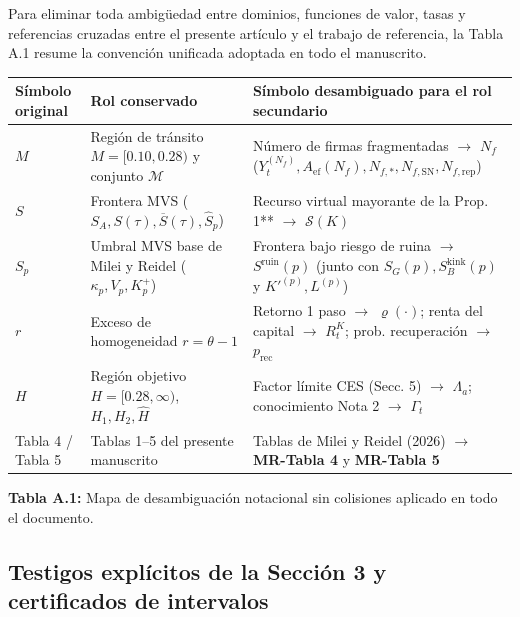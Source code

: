 \documentclass[11pt,letterpaper]{article}
\theoremstyle{plain}
\begin{document}
Para eliminar toda ambigüedad entre dominios, funciones de valor, tasas y referencias cruzadas entre el presente artículo y el trabajo de referencia, la Tabla A.1 resume la convención unificada adoptada en todo el manuscrito.

\begin{table}[htbp]
\centering
\scriptsize
\setlength{\tabcolsep}{4pt}
\begin{tabular}{@{}lll@{}}
\toprule
\textbf{Símbolo original} & \textbf{Rol conservado} & \textbf{Símbolo desambiguado para el rol secundario} \\
\midrule
$M$ & Región de tránsito $M=[0.10,0.28)$ y conjunto $\mathcal{M}$ & Número de firmas fragmentadas $\to$ \textbf{$N_f$} ($Y_t^{(N_f)}, A_{\mathrm{ef}}(N_f), N_{f,*}, N_{f,\mathrm{SN}}, N_{f,\mathrm{rep}}$) \\
$S$ & Frontera MVS ($S_A, S(\tau), \overline{S}(\tau), \hat{S}_p$) & Recurso virtual mayorante de la Prop. 1** $\to$ \textbf{$\mathcal{S}(K)$} \\
$S_p$ & Umbral MVS base de Milei y Reidel ($\kappa_p, V_p, K_p^+$) & Frontera bajo riesgo de ruina $\to$ \textbf{$S^{\mathrm{ruin}}(p)$} (junto con $S_G(p), S_B^{\mathrm{kink}}(p)$ y $K'^{(p)}, L^{(p)}$) \\
$r$ & Exceso de homogeneidad $r=\theta-1$ & Retorno 1 paso $\to$ \textbf{$\varrho(\cdot)$}; renta del capital $\to$ \textbf{$R_t^K$}; prob. recuperación $\to$ \textbf{$p_{\mathrm{rec}}$} \\
$H$ & Región objetivo $H=[0.28,\infty)$, $H_1, H_2, \hat{H}$ & Factor límite CES (Secc. 5) $\to$ \textbf{$\Lambda_a$}; conocimiento Nota 2 $\to$ \textbf{$\Gamma_t$} \\
Tabla 4 / Tabla 5 & Tablas 1--5 del presente manuscrito & Tablas de Milei y Reidel (2026) $\to$ \textbf{MR-Tabla 4} y \textbf{MR-Tabla 5} \\
\bottomrule
\end{tabular}
\par\vspace{0.45em}
\begin{minipage}{0.95\linewidth}\centering\footnotesize
\textbf{Tabla A.1:} Mapa de desambiguación notacional sin colisiones aplicado en todo el documento.
\end{minipage}
\end{table}

\subsection{\texorpdfstring{Testigos explícitos de la Sección 3 y certificados de intervalos}{Testigos explícitos de la Sección 3 y certificados de intervalos}}
\end{document}
